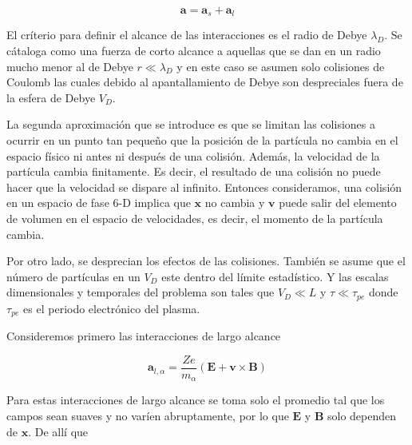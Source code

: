 \begin{equation*}
  \textbf{a} = \textbf{a}_s + \textbf{a}_l
\end{equation*}

El cr\'iterio para definir el alcance de las interacciones es el radio de Debye $\lambda_D$. Se c\'ataloga como una fuerza de corto alcance a aquellas que se dan en un radio mucho menor al de Debye $r \ll \lambda_D$ y en este caso se asumen solo colisiones de Coulomb las cuales debido al apantallamiento de Debye son despreciales fuera de la esfera de Debye $V_D$. 

La segunda aproximaci\'on que se introduce es que se limitan las colisiones a ocurrir en un punto tan pequeño que la posici\'on de la part\'icula no cambia en el espacio f\'isico ni antes ni despu\'es de una colisi\'on. Adem\'as, la velocidad de la part\'icula cambia finitamente. Es decir, el resultado de una colisi\'on no puede hacer que la velocidad se dispare al infinito. Entonces consideramos, una colisi\'on en un espacio de fase 6-D implica que $\textbf{x}$ no cambia y $\textbf{v}$ puede salir del elemento de volumen en el espacio de velocidades, es decir, el momento de la part\'icula cambia. 

Por otro lado, se desprecian los efectos de las colisiones. Tambi\'en se asume que el n\'umero de part\'iculas en un $V_D$ este dentro del l\'imite estad\'istico. Y las escalas dimensionales y temporales del problema son tales que $V_D \ll L$ y $\tau \ll \tau_{pe}$ donde $\tau_{pe}$ es el periodo electr\'onico del plasma. 

Consideremos primero las interacciones de largo alcance

\begin{equation*}
  \textbf{a}_{l,\alpha} = \frac{Ze}{m_\alpha}(\textbf{E} + \textbf{v}\times\textbf{B})
\end{equation*}

Para estas interacciones de largo alcance se toma solo el promedio tal que los campos sean suaves y no var\'ien abruptamente, por lo que $\textbf{E}$ y $\textbf{B}$ solo dependen de $\textbf{x}$. De all\'i que

